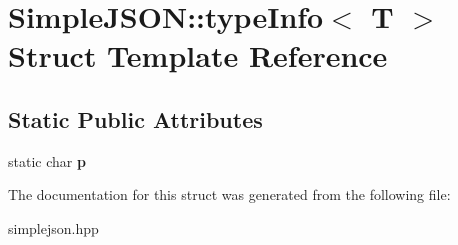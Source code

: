 \hypertarget{struct_simple_j_s_o_n_1_1type_info}{\section{Simple\+J\+S\+O\+N\+:\+:type\+Info$<$ T $>$ Struct Template Reference}
\label{struct_simple_j_s_o_n_1_1type_info}
}
\subsection*{Static Public Attributes}
\begin{DoxyCompactItemize}
\item 
\hypertarget{struct_simple_j_s_o_n_1_1type_info_a16a7ba9026d7f01ebb2568465bb1623b}{static char {\bfseries p}}\label{struct_simple_j_s_o_n_1_1type_info_a16a7ba9026d7f01ebb2568465bb1623b}

\end{DoxyCompactItemize}


The documentation for this struct was generated from the following file\+:\begin{DoxyCompactItemize}
\item 
simplejson.\+hpp\end{DoxyCompactItemize}
